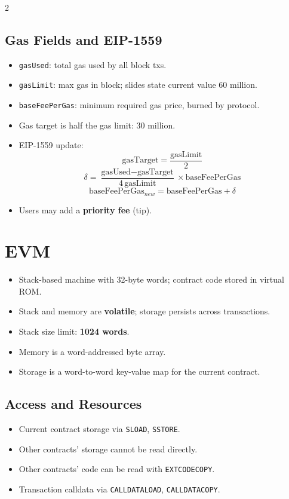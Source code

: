 \documentclass[10pt,a4paper]{article}
\newcommand{\term}[1]{\textbf{#1}}
\newcommand{\code}[1]{\texttt{#1}}
\newcommand{\imp}[1]{\textbf{#1}}
\begin{document}
\begin{multicols*}{2}
\subsection*{Gas Fields and EIP-1559}
\begin{itemize}
\item \code{gasUsed}: total gas used by all block txs.
\item \code{gasLimit}: max gas in block; slides state current value $60$ million.
\item \code{baseFeePerGas}: minimum required gas price, burned by protocol.
\item Gas target is half the gas limit: $30$ million.
\item EIP-1559 update:
\[
\text{gasTarget} = \frac{\text{gasLimit}}{2}
\]
\[
\delta = \frac{\text{gasUsed}-\text{gasTarget}}{4\,\text{gasLimit}} \times \text{baseFeePerGas}
\]
\[
\text{baseFeePerGas}_{new} = \text{baseFeePerGas} + \delta
\]
\item Users may add a \term{priority fee} (tip).
\end{itemize}

\section*{EVM}
\begin{itemize}
\item Stack-based machine with 32-byte words; contract code stored in virtual ROM.
\item Stack and memory are \term{volatile}; storage persists across transactions.
\item Stack size limit: \imp{1024 words}.
\item Memory is a word-addressed byte array.
\item Storage is a word-to-word key-value map for the current contract.
\end{itemize}

\subsection*{Access and Resources}
\begin{itemize}
\item Current contract storage via \code{SLOAD}, \code{SSTORE}.
\item Other contracts' storage cannot be read directly.
\item Other contracts' code can be read with \code{EXTCODECOPY}.
\item Transaction calldata via \code{CALLDATALOAD}, \code{CALLDATACOPY}.
\end{itemize}


\end{multicols*}
\end{document}
